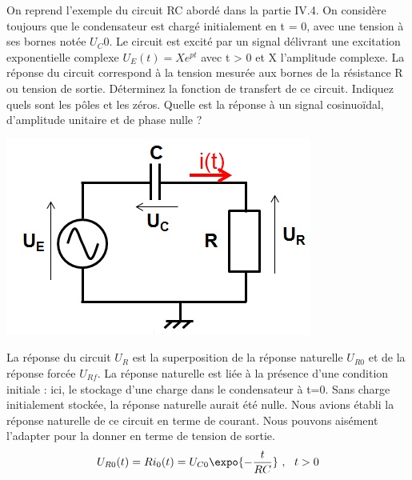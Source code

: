 	\begin{minipage}[l]{0.7\linewidth}
          On reprend l'exemple du circuit RC abordé dans la partie
          IV.4. On considère toujours que le condensateur est chargé
          initialement en t = 0, avec une tension à ses bornes notée
          $U_C0$. Le circuit est excité par un signal délivrant une
          excitation exponentielle complexe $U_{E}(t)=Xe^{pt}$ avec t
          > 0 et X l'amplitude complexe. La réponse du circuit
          correspond à la tension mesurée aux bornes de la résistance
          R ou tension de sortie. Déterminez la fonction de transfert
          de ce circuit. Indiquez quels sont les pôles et les
          zéros. Quelle est la réponse à un signal cosinuoïdal,
          d'amplitude unitaire et de phase nulle ?
	\end{minipage} \hfill
	\begin{minipage}[r]{0.4\linewidth}
          \includegraphics[scale=0.5]{images/circuit_RC_reponse_forcee.jpg}
	\end{minipage}
	\vspace{0.5\baselineskip}

	La réponse du circuit $U_{R}$ est la superposition de la
        réponse naturelle $U_{R0}$ et de la réponse forcée
        $U_{Rf}$. La réponse naturelle est liée à la présence d'une
        condition initiale : ici, le stockage d'une charge dans le
        condensateur à t=0. Sans charge initialement stockée, la
        réponse naturelle aurait été nulle. Nous avions établi la
        réponse naturelle de ce circuit en terme de courant. Nous
        pouvons aisément l'adapter pour la donner en terme de tension
        de sortie.
	\begin{equation*}\label{}
          U_{R0}(t)=Ri_{0}(t)=U_{C0}\expo{-\frac{t}{RC}}~,~~t>0
	\end{equation*}

